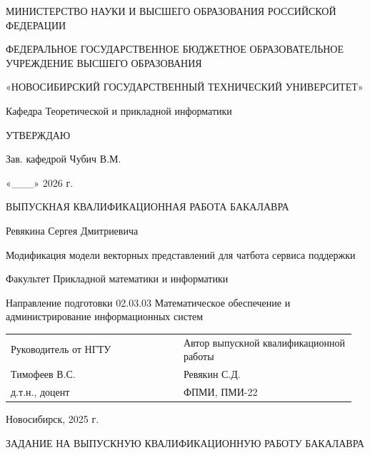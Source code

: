 \documentclass[14pt,a4paper]{extarticle}
\numberwithin{figure}{section}
\numberwithin{table}{section}
\begin{document}
\pagestyle{empty}

\begin{center}
МИНИСТЕРСТВО НАУКИ И ВЫСШЕГО ОБРАЗОВАНИЯ РОССИЙСКОЙ ФЕДЕРАЦИИ

ФЕДЕРАЛЬНОЕ ГОСУДАРСТВЕННОЕ БЮДЖЕТНОЕ ОБРАЗОВАТЕЛЬНОЕ УЧРЕЖДЕНИЕ ВЫСШЕГО ОБРАЗОВАНИЯ

«НОВОСИБИРСКИЙ ГОСУДАРСТВЕННЫЙ ТЕХНИЧЕСКИЙ УНИВЕРСИТЕТ»
\end{center}

Кафедра Теоретической и прикладной информатики

\vspace{8mm}
\begin{flushright}
УТВЕРЖДАЮ

Зав. кафедрой \hspace{10mm} Чубич В.М.

«\_\_\_» \hspace{8mm} 2026 г.
\end{flushright}

\vfill
\begin{center}
ВЫПУСКНАЯ КВАЛИФИКАЦИОННАЯ РАБОТА БАКАЛАВРА

\vspace{8mm}
Ревякина Сергея Дмитриевича

\vspace{8mm}
Модификация модели векторных представлений для чатбота сервиса поддержки
\end{center}

\vfill
Факультет Прикладной математики и информатики

Направление подготовки 02.03.03 Математическое обеспечение и администрирование информационных систем

\vspace{12mm}
\begin{tabular}{p{0.48\linewidth}p{0.48\linewidth}}
Руководитель от НГТУ & Автор выпускной квалификационной работы\\
Тимофеев В.С. & Ревякин С.Д.\\
д.т.н., доцент & ФПМИ, ПМИ-22\\
\end{tabular}

\vfill
\begin{center}
Новосибирск, 2025 г.
\end{center}
\clearpage

\begin{center}
ЗАДАНИЕ НА ВЫПУСКНУЮ КВАЛИФИКАЦИОННУЮ РАБОТУ БАКАЛАВРА
\end{center}
\end{document}
